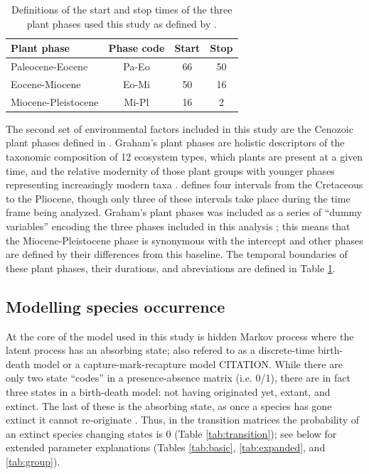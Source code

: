 \documentclass[12pt,letterpaper]{article}
\begin{document}
\begin{table}
  \centering
  \caption[Plant phase defintions]{Definitions of the start and stop times of the three plant phases used this study as defined by \citet{Graham2011a}.}
  \label{tab:plant_def}
  \begin{tabular}{l c c c}
    \hline
    Plant phase & Phase code & Start & Stop \\
    \hline
    Paleocene-Eocene & Pa-Eo & 66 & 50 \\
    Eocene-Miocene & Eo-Mi & 50 & 16 \\
    Miocene-Pleistocene & Mi-Pl & 16 & 2 \\
    \hline
  \end{tabular}
\end{table}

The second set of environmental factors included in this study are the Cenozoic plant phases defined in \citet{Graham2011a}. Graham's plant phases are holistic descriptors of the taxonomic composition of 12 ecosystem types, which plants are present at a given time, and the relative modernity of those plant groups with younger phases representing increasingly modern taxa \citep{Graham2011a}. \citet{Graham2011a} defines four intervals from the Cretaceous to the Pliocene, though only three of these intervals take place during the time frame being analyzed. Graham's plant phases was included as a series of ``dummy variables'' encoding the three phases included in this analysis \citep{Gelman2007}; this means that the Miocene-Pleistocene phase is synonymous with the intercept and other phases are defined by their differences from this baseline. The temporal boundaries of these plant phases, their durations, and abreviations are defined in Table \ref{tab:plant_def}.


\subsection*{Modelling species occurrence}
At the core of the model used in this study is hidden Markov process where the latent process has an absorbing state; also refered to as a discrete-time birth-death model \citep{Allen2011} or a capture-mark-recapture model CITATION. While there are only two state ``codes'' in a presence-absence matrix (i.e. 0/1), there are in fact three states in a birth-death model: not having originated yet, extant, and extinct. The last of these is the absorbing state, as once a species has gone extinct it cannot re-originate \citep{Allen2011}. Thus, in the transition matrices the probability of an extinct species changing states is 0 (Table \ref{tab:transition}); see below for extended parameter explanations (Tables \ref{tab:basic}, \ref{tab:expanded}, and \ref{tab:group}).
\end{document}
